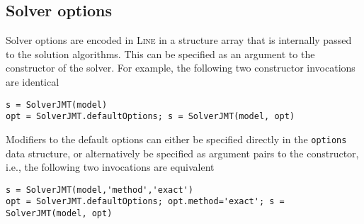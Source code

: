 \subsection{Solver options}
Solver options are encoded in \textsc{Line} in a structure array that is internally passed to the solution algorithms. This can be specified as an argument to the constructor of the solver. For example, the following two constructor invocations are identical
\begin{lstlisting}
s = SolverJMT(model)
opt = SolverJMT.defaultOptions; s = SolverJMT(model, opt)
\end{lstlisting}
Modifiers to the default options can either be specified directly in the \texttt{options} data structure, or alternatively be specified as argument pairs to the constructor, i.e., the following two invocations are equivalent
\begin{lstlisting}
s = SolverJMT(model,'method','exact')
opt = SolverJMT.defaultOptions; opt.method='exact'; s = SolverJMT(model, opt)
\end{lstlisting}

